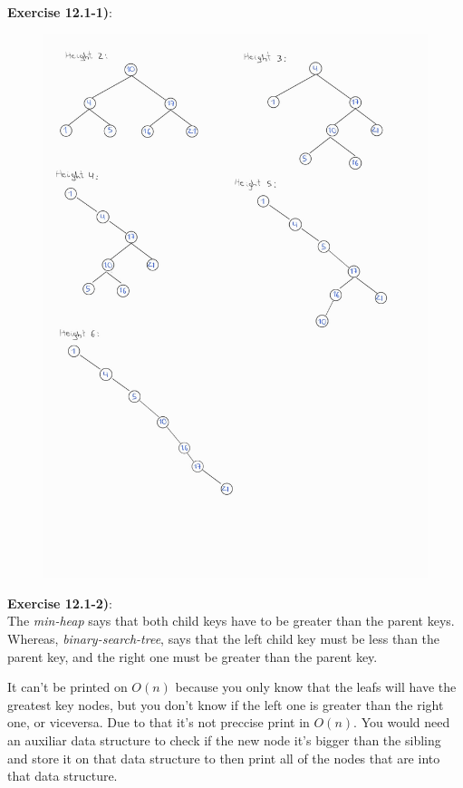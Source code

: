 \documentclass{article}
\newcounter{exercise}[section]   %
\begin{document}
\textbf{Exercise 12.1-1)}:
\begin{figure}[h]
    \includegraphics[scale=0.3]{Problem12_1_1.jpeg}
    \centering
\end{figure}
\clearpage

\textbf{Exercise 12.1-2)}:\\
The \textit{min-heap} says that both child keys have to be greater than the parent keys.
Whereas, \textit{binary-search-tree}, says that the left child key must be less than the
parent key, and the right one must be greater than the parent key.

It can't be printed on \(O(n)\) because you only know that the leafs will have the greatest
key nodes, but you don't know if the left one is greater than the right one, or viceversa.
Due to that it's not preccise print in \(O(n)\). You would need an auxiliar data structure
to check if the new node it's bigger than the sibling and store it on that data structure 
to then print all of the nodes that are into that data structure.
\end{document}
